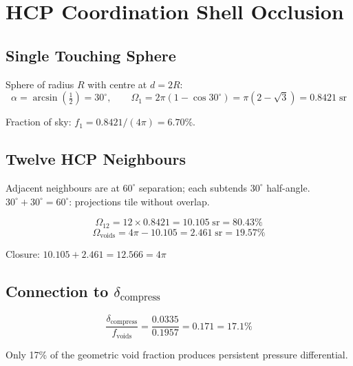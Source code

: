 \section{HCP Coordination Shell Occlusion}

\subsection{Single Touching Sphere}

Sphere of radius $R$ with centre at $d = 2R$:
\begin{equation}
  \alpha = \arcsin\!\left(\tfrac{1}{2}\right) = 30^\circ, \qquad
  \Omega_1 = 2\pi(1 - \cos 30^\circ) = \pi(2 - \sqrt{3}) = 0.8421\;\text{sr}
\end{equation}

Fraction of sky: $f_1 = 0.8421/(4\pi) = 6.70\%$.

\subsection{Twelve HCP Neighbours}

Adjacent neighbours are at $60^\circ$ separation; each subtends $30^\circ$ half-angle.  $30^\circ + 30^\circ = 60^\circ$: projections tile without overlap.

\begin{equation}
  \Omega_{12} = 12 \times 0.8421 = 10.105\;\text{sr} = 80.43\%
\end{equation}
\begin{equation}
  \Omega_{\text{voids}} = 4\pi - 10.105 = 2.461\;\text{sr} = 19.57\%
\end{equation}

Closure: $10.105 + 2.461 = 12.566 = 4\pi$ \checkmark

\subsection{Connection to $\delta_{\text{compress}}$}

\begin{equation}
  \frac{\delta_{\text{compress}}}{f_{\text{voids}}} = \frac{0.0335}{0.1957} = 0.171 = 17.1\%
\end{equation}

Only 17\% of the geometric void fraction produces persistent pressure differential.

